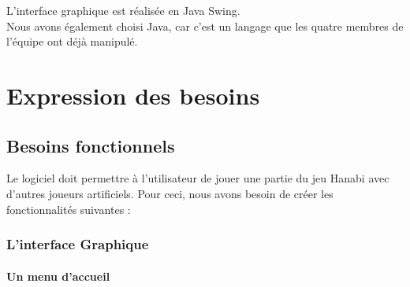 \documentclass[11pt, letterpaper]{article}
\begin{document}
\noindent
L'interface graphique est réalisée en Java Swing.\\

\noindent
Nous avons également choisi Java, car c'est un langage que les quatre membres de l'équipe ont déjà manipulé.\\

\section {Expression des besoins}

\subsection{Besoins fonctionnels}

\noindent
Le logiciel doit permettre à l'utilisateur de jouer une partie du jeu Hanabi avec d'autres joueurs artificiels. Pour ceci, nous avons besoin de créer les fonctionnalités suivantes : 

\subsubsection{L'interface Graphique}

\paragraph{Un menu d'accueil}
\end{document}

